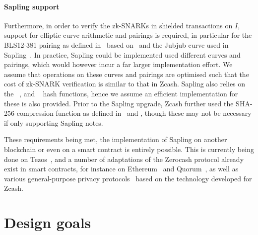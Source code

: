 \paragraph{Sapling support}

Furthermore, in order to verify the zk-SNARKs in shielded transactions on $I$, support for elliptic curve arithmetic and pairings is required, in particular for the BLS12-381 pairing as defined in~\cite[Section 5.4.8.2]{hopwood2016zcash} based on~\cite{bowe2017bls12,bowe2017bls12github} and the Jubjub curve used in Sapling~\cite[Section 5.4.8.3]{hopwood2016zcash}.
In practice, Sapling could be implemented used different curves and pairings, which would however incur a far larger implementation effort.
We assume that operations on these curves and pairings are optimised such that the cost of zk-SNARK verification is similar to that in Zcash.
Sapling also relies on the \shatwo~\cite{nist2015shs}, \blakeb and \blakes~\cite{BLAKE2-2020-11-05,rfc7693blake2} hash functions, hence we assume an efficient implementation for these is also provided.
Prior to the Sapling upgrade, Zcash further used the SHA-256 compression function \shacompress as defined in~\cite[Section 5.4.1.1]{hopwood2016zcash} and \shafive, though these may not be necessary if only supporting Sapling notes.

These requirements being met, the implementation of Sapling on another blockchain or even on a smart contract is entirely possible.
This is currently being done on Tezos~\cite{tezos2014whitepaper,saplingTezos}, and a number of adaptations of the Zerocash protocol already exist in smart contracts, for instance on Ethereum~\cite{rondelet2019zeth} and Quorum~\cite{ZSLConsenSysquorumWikiGitHub-2020-11-27}, as well as various general-purpose privacy protocols~\cite{williamson2018aztec,phantom2020} based on the technology developed for Zcash.


\section{Design goals}

